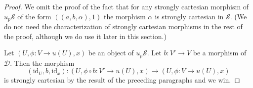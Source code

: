 \begin{proof}
\medskip\noindent
We omit the proof of the fact that for any strongly cartesian morphism
of $u_p\mathcal{S}$ of the form $((a, b, \alpha), 1)$ the morphism
$\alpha$ is strongly cartesian in $\mathcal{S}$.
(We do not need the characterization of strongly cartesian morphisms
in the rest of the proof, although we do use it later in this section.)

\medskip\noindent
Let $(U, \phi : V \to u(U), x)$ be an object of $u_p\mathcal{S}$.
Let $b : V' \to V$ be a morphism of $\mathcal{D}$. Then the morphism
$$
(\text{id}_U, b, \text{id}_x) :
(U, \phi \circ b : V' \to u(U), x)
\longrightarrow
(U, \phi : V \to u(U), x)
$$
is strongly cartesian by the result of the preceding paragraphs and we win.
\end{proof}
